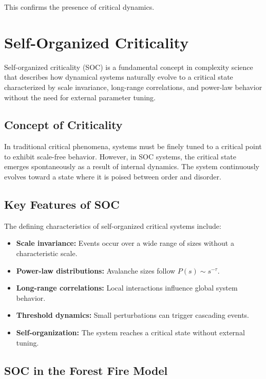 \documentclass[12pt,a4paper]{article}
\begin{document}
This confirms the presence of critical dynamics.

\section{Self-Organized Criticality }

Self-organized criticality (SOC) is a fundamental concept in complexity science that describes how dynamical systems naturally evolve to a critical state characterized by scale invariance, long-range correlations, and power-law behavior without the need for external parameter tuning.

\subsection{Concept of Criticality}

In traditional critical phenomena, systems must be finely tuned to a critical point to exhibit scale-free behavior. However, in SOC systems, the critical state emerges spontaneously as a result of internal dynamics. The system continuously evolves toward a state where it is poised between order and disorder.

\subsection{Key Features of SOC}

The defining characteristics of self-organized critical systems include:

\begin{itemize}
\item \textbf{Scale invariance:} Events occur over a wide range of sizes without a characteristic scale.
\item \textbf{Power-law distributions:} Avalanche sizes follow $P(s) \sim s^{-\tau}$.
\item \textbf{Long-range correlations:} Local interactions influence global system behavior.
\item \textbf{Threshold dynamics:} Small perturbations can trigger cascading events.
\item \textbf{Self-organization:} The system reaches a critical state without external tuning.
\end{itemize}

\subsection{SOC in the Forest Fire Model}
\end{document}
